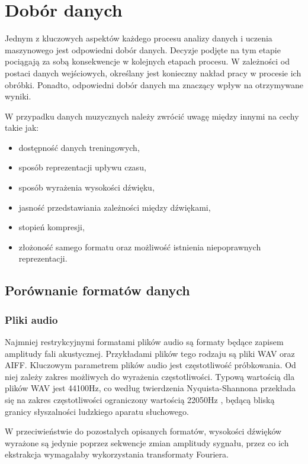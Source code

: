 \chapter {Dobór danych} 
{
    Jednym z kluczowych aspektów każdego procesu analizy danych i uczenia maszynowego
    jest odpowiedni dobór danych. Decyzje podjęte na tym etapie pociągają za sobą 
    konsekwencje w kolejnych etapach procesu. W zależności od postaci danych wejściowych,
    określany jest konieczny nakład pracy w procesie ich obróbki. 
    Ponadto, odpowiedni dobór danych ma znaczący wpływ na otrzymywane wyniki.

    W przypadku danych muzycznych należy zwrócić uwagę między innymi na cechy takie jak:
    \begin{itemize}
        \item dostępność danych treningowych,
        \item sposób reprezentacji upływu czasu,
        \item sposób wyrażenia wysokości dźwięku,
        \item jasność przedstawiania zależności między dźwiękami,
        \item stopień kompresji,
        \item złożoność samego formatu oraz możliwość istnienia niepoprawnych reprezentacji.
    \end{itemize}

    \section{Porównanie formatów danych}
    {
        \subsection{Pliki audio}
        {
            Najmniej restrykcyjnymi formatami plików audio są formaty będące zapisem
            amplitudy fali akustycznej. Przykładami plików tego rodzaju są pliki WAV
            oraz AIFF.
            Kluczowym parametrem plików audio jest częstotliwość próbkowania. Od niej
            zależy zakres możliwych do wyrażenia częstotliwości. Typową wartością dla plików
            WAV jest 44100Hz, co według twierdzenia Nyquista-Shannona przekłada się na zakres
            częstotliwości ograniczony wartością 22050Hz \cite{Shannon1949CommunicationIT}, będącą bliską granicy słyszalności
            ludzkiego aparatu słuchowego. 

            W przeciwieństwie do pozostałych opisanych formatów, wysokości dźwięków wyrażone są 
            jedynie poprzez sekwencje zmian amplitudy sygnału, przez co
            ich ekstrakcja wymagałaby wykorzystania transformaty Fouriera.

}}}

